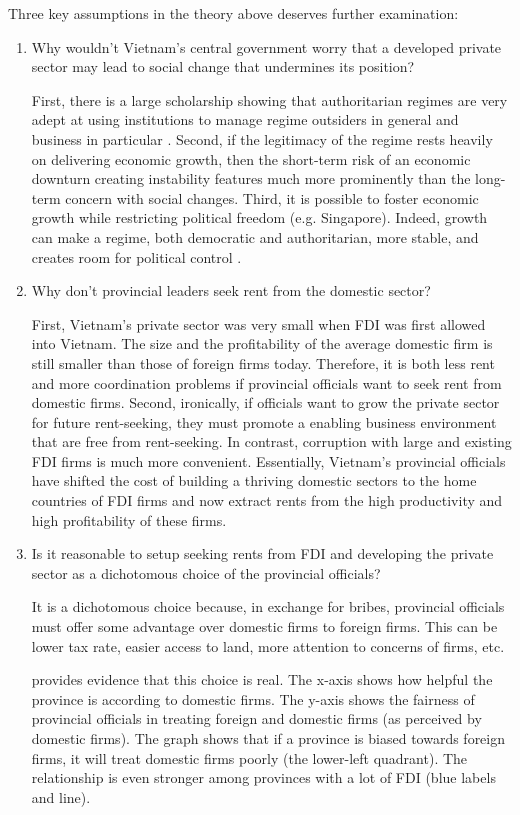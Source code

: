 Three key assumptions in the theory above deserves further examination:
\begin{enumerate}
\item Why wouldn't Vietnam's central government worry that a developed private sector may lead to social change that undermines its position?

First, there is a large scholarship showing that authoritarian regimes are very adept at using institutions to manage regime outsiders in general and business in particular \citep{Gandhi2006, Gandhi2008, Wright2008, Le2015}. Second, if the legitimacy of the regime rests heavily on delivering economic growth, then the short-term risk of an economic downturn creating instability features much more prominently than the long-term concern with social changes. Third, it is possible to foster economic growth while restricting political freedom (e.g. Singapore). Indeed, growth can make a regime, both democratic and authoritarian, more stable, and creates room for political control \citep{Przeworski1997}.

\item Why don't provincial leaders seek rent from the domestic sector? 

First, Vietnam's private sector was very small when FDI was first allowed into Vietnam. The size and the profitability of the average domestic firm is still smaller than those of foreign firms today. Therefore, it is both less rent and more coordination problems if provincial officials want to seek rent from domestic firms. Second, ironically, if officials want to grow the private sector for future rent-seeking, they must promote a enabling business environment that are free from rent-seeking. In contrast, corruption with large and existing FDI firms is much more convenient. Essentially, Vietnam's provincial officials have shifted the cost of building a thriving domestic sectors to the home countries of FDI firms and now extract rents from the high productivity and high profitability of these firms. 

\item Is it reasonable to setup seeking rents from FDI and developing the private sector as a dichotomous choice of the provincial officials?

It is a dichotomous choice because, in exchange for bribes, provincial officials must offer some advantage over domestic firms to foreign firms. This can be lower tax rate, easier access to land, more attention to concerns of firms, etc.

 provides evidence that this choice is real. The x-axis shows how helpful the province is according to domestic firms. The y-axis shows the fairness of provincial officials in treating foreign and domestic firms (as perceived by domestic firms). The graph shows that if a province is biased towards foreign firms, it will treat domestic firms poorly (the lower-left quadrant). The relationship is even stronger among provinces with a lot of FDI (blue labels and line).
\end{enumerate}

